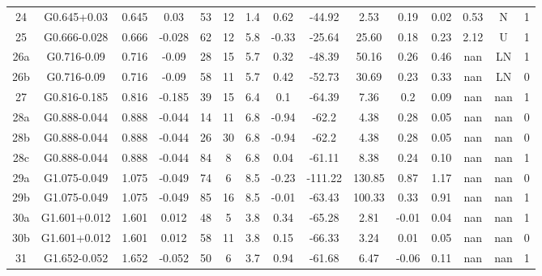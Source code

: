 \begin{table}
\begin{tabular}{ccccccccccccccc}
24 & G0.645+0.03 & 0.645 & 0.03 & 53 & 12 & 1.4 & 0.62 & -44.92 & 2.53 & 0.19 & 0.02 & 0.53 & N & 1 \\
25 & G0.666-0.028 & 0.666 & -0.028 & 62 & 12 & 5.8 & -0.33 & -25.64 & 25.60 & 0.18 & 0.23 & 2.12 & U & 1 \\
26a & G0.716-0.09 & 0.716 & -0.09 & 28 & 15 & 5.7 & 0.32 & -48.39 & 50.16 & 0.26 & 0.46 & nan & LN & 1 \\
26b & G0.716-0.09 & 0.716 & -0.09 & 58 & 11 & 5.7 & 0.42 & -52.73 & 30.69 & 0.23 & 0.33 & nan & LN & 0 \\
27 & G0.816-0.185 & 0.816 & -0.185 & 39 & 15 & 6.4 & 0.1 & -64.39 & 7.36 & 0.2 & 0.09 & nan & nan & 1 \\
28a & G0.888-0.044 & 0.888 & -0.044 & 14 & 11 & 6.8 & -0.94 & -62.2 & 4.38 & 0.28 & 0.05 & nan & nan & 0 \\
28b & G0.888-0.044 & 0.888 & -0.044 & 26 & 30 & 6.8 & -0.94 & -62.2 & 4.38 & 0.28 & 0.05 & nan & nan & 0 \\
28c & G0.888-0.044 & 0.888 & -0.044 & 84 & 8 & 6.8 & 0.04 & -61.11 & 8.38 & 0.24 & 0.10 & nan & nan & 1 \\
29a & G1.075-0.049 & 1.075 & -0.049 & 74 & 6 & 8.5 & -0.23 & -111.22 & 130.85 & 0.87 & 1.17 & nan & nan & 0 \\
29b & G1.075-0.049 & 1.075 & -0.049 & 85 & 16 & 8.5 & -0.01 & -63.43 & 100.33 & 0.33 & 0.91 & nan & nan & 1 \\
30a & G1.601+0.012 & 1.601 & 0.012 & 48 & 5 & 3.8 & 0.34 & -65.28 & 2.81 & -0.01 & 0.04 & nan & nan & 1 \\
30b & G1.601+0.012 & 1.601 & 0.012 & 58 & 11 & 3.8 & 0.15 & -66.33 & 3.24 & 0.01 & 0.05 & nan & nan & 0 \\
31 & G1.652-0.052 & 1.652 & -0.052 & 50 & 6 & 3.7 & 0.94 & -61.68 & 6.47 & -0.06 & 0.11 & nan & nan & 1 \\
\end{tabular}
\end{table}
